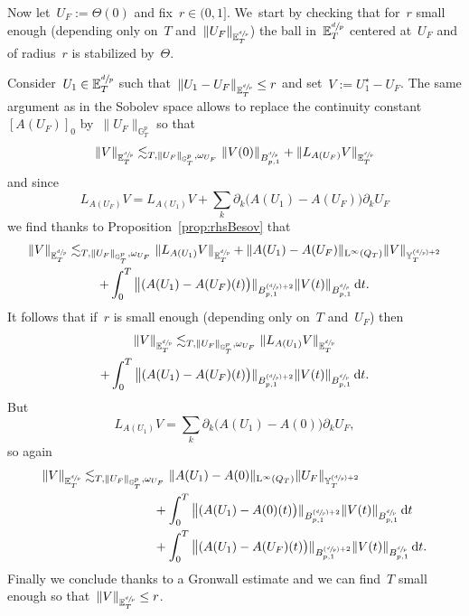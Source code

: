 \documentclass[JEP,XML,SOM,Unicode,published]{cedram}
\newcommand{\Psfrac}[2]{(\sfrac{#1}{#2})}
\theoremstyle{definition}
\newcommand\dd{\mathrm{d}}
\renewcommand\L{\mathrm{L}}
\begin{document}
Now let~$U_F:= \Theta(0)$ and fix~$r \in (0,1]$. We~start by checking that for~$r$ small enough (depending only on~$T$ and~$\|U_F\|_{{\mathbb E}^{\sfrac dp}_T}$) the ball in~${\mathbb E}^{\sfrac dp}_T$ centered at~$U_F$ and of radius~$r$ is stabilized by~$\Theta$.

Consider~$U_1 \in {\mathbb E}^{\sfrac dp}_T$ such that~$\|U_1-U_F\|_{ {\mathbb E}^{\sfrac dp}_T} \leq r$ and set~$V:=U_1^\star - U_F$. The same argument as in the Sobolev space allows to replace the continuity constant~$[A(U_F)]_0$ by~$\|U_F\|_{\mathbb G^p_T}$ so that
\[
\|V\|_{{\mathbb E}^{\sfrac dp}_T} \lesssim_{T,\|U_F\|_{\mathbb G^p_T},\omega_{U_F} } \| V (0)\|_{B^{\sfrac dp}_{p,1}} + \|L_{A(U_F)}V\|_{\mathbb E_T^{\sfrac dp}}
\]
and since
\[
L_{A(U_F)} V = L_{A(U_1)} V + \sum_k \partial_k \bigl(A(U_1) - A(U_F)\bigr)\partial_kU_F
\]
we find thanks to Proposition~\ref{prop:rhsBesov} that
\begin{multline*}
\|V\|_{{\mathbb E}^{\sfrac dp}_T}\lesssim_{T,\|U_F\|_{\mathbb G^p_T},\omega_{U_F}} \|L_{A(U_1)}V\|_{\mathbb E_T^{\sfrac dp}} + \|A(U_1)- A(U_F)\|_{\L^\infty(Q_T)} \|V\|_{{\mathbb Y}^{\Psfrac dp+2}_T} \\
+ \int_0^T
\big \|(A(U_1)- A(U_F)(t)\bigr)\|_{B_{p,1}^{\Psfrac dp+2}} \| V (t)\|_{B^{\sfrac dp}_{p,1}} \, \dd t.
\end{multline*}
It follows that if~$r$ is small enough (depending only on~$T$ and~$ U_F $) then
\begin{multline*}
\|V\|_{{\mathbb E}^{\sfrac dp}_T} \lesssim_{T, \|U_F\|_{\mathbb G^p_T},\omega_{U_F} } \|L_{A(U_1)}V\|_{\mathbb E_T^{\sfrac dp}}\\
+ \int_0^T
\big \|(A(U_1)- A(U_F)(t)\bigr)\|_{B_{p,1}^{\Psfrac dp+2}} \| V (t)\|_{B^{\sfrac dp}_{p,1}} \, \dd t.
\end{multline*}
But
\[
L_{A(U_1)} V = \sum_k \partial_k \bigl(A(U_1) - A(0)\bigr)\partial_kU_F,
\]
so again
\[
\begin{aligned}
\|V\|_{{\mathbb E}^{\sfrac dp}_T} & \lesssim_{T, \|U_F\|_{\mathbb G^p_T},\omega_{U_F}} \|A(U_1)- A(0)\|_{\L^\infty(Q_T)} \|U_F\|_{\mathbb Y_T^{\Psfrac dp+2}} \\
&\hspace*{2cm}+ \int_0^T
\big \|(A(U_1)- A(0)(t)\bigr)\|_{B_{p,1}^{\Psfrac dp+2}} \| V (t)\|_{B^{\sfrac dp}_{p,1}} \, \dd t\\
&\hspace*{2cm}+ \int_0^T
\big \|(A(U_1)- A(U_F)(t)\bigr)\|_{B_{p,1}^{\Psfrac dp+2}} \| V (t)\|_{B^{\sfrac dp}_{p,1}} \, \dd t.
\end{aligned}
\]
Finally we conclude thanks to a Gronwall estimate and we can find~$T$ small enough so that~$ \|V\|_{{\mathbb E}^{\sfrac dp}_T} \leq r$.
\end{document}

